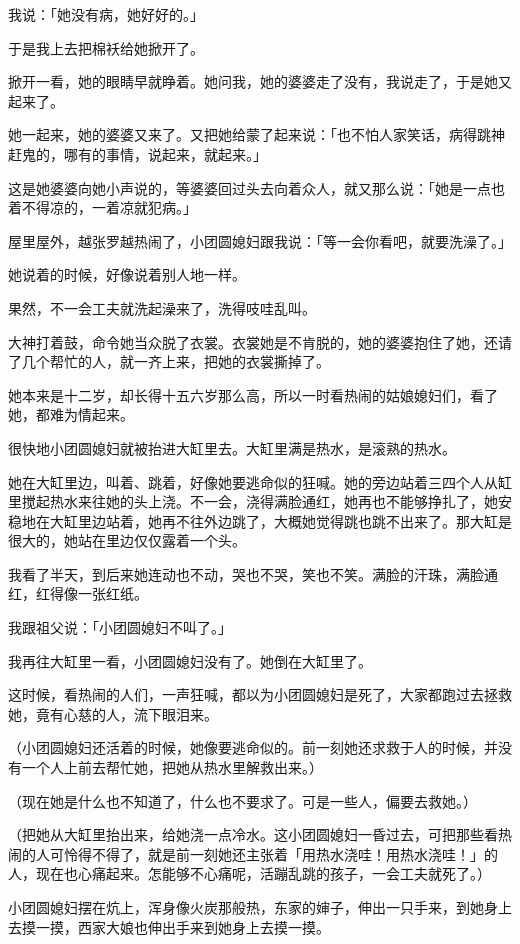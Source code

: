 \documentclass[UTF8]{ctexart}
\begin{document}
我说：「她没有病，她好好的。」

于是我上去把棉袄给她掀开了。

掀开一看，她的眼睛早就睁着。她问我，她的婆婆走了没有，我说走了，于是她又起来了。

她一起来，她的婆婆又来了。又把她给蒙了起来说：「也不怕人家笑话，病得跳神赶鬼的，哪有的事情，说起来，就起来。」

这是她婆婆向她小声说的，等婆婆回过头去向着众人，就又那么说：「她是一点也着不得凉的，一着凉就犯病。」

屋里屋外，越张罗越热闹了，小团圆媳妇跟我说：「等一会你看吧，就要洗澡了。」

她说着的时候，好像说着别人地一样。

果然，不一会工夫就洗起澡来了，洗得吱哇乱叫。

大神打着鼓，命令她当众脱了衣裳。衣裳她是不肯脱的，她的婆婆抱住了她，还请了几个帮忙的人，就一齐上来，把她的衣裳撕掉了。

她本来是十二岁，却长得十五六岁那么高，所以一时看热闹的姑娘媳妇们，看了她，都难为情起来。

很快地小团圆媳妇就被抬进大缸里去。大缸里满是热水，是滚熟的热水。

她在大缸里边，叫着、跳着，好像她要逃命似的狂喊。她的旁边站着三四个人从缸里搅起热水来往她的头上浇。不一会，浇得满脸通红，她再也不能够挣扎了，她安稳地在大缸里边站着，她再不往外边跳了，大概她觉得跳也跳不出来了。那大缸是很大的，她站在里边仅仅露着一个头。

我看了半天，到后来她连动也不动，哭也不哭，笑也不笑。满脸的汗珠，满脸通红，红得像一张红纸。

我跟祖父说：「小团圆媳妇不叫了。」

我再往大缸里一看，小团圆媳妇没有了。她倒在大缸里了。

这时候，看热闹的人们，一声狂喊，都以为小团圆媳妇是死了，大家都跑过去拯救她，竟有心慈的人，流下眼泪来。

（小团圆媳妇还活着的时候，她像要逃命似的。前一刻她还求救于人的时候，并没有一个人上前去帮忙她，把她从热水里解救出来。）

（现在她是什么也不知道了，什么也不要求了。可是一些人，偏要去救她。）

（把她从大缸里抬出来，给她浇一点冷水。这小团圆媳妇一昏过去，可把那些看热闹的人可怜得不得了，就是前一刻她还主张着「用热水浇哇！用热水浇哇！」的人，现在也心痛起来。怎能够不心痛呢，活蹦乱跳的孩子，一会工夫就死了。）

小团圆媳妇摆在炕上，浑身像火炭那般热，东家的婶子，伸出一只手来，到她身上去摸一摸，西家大娘也伸出手来到她身上去摸一摸。
\end{document}
